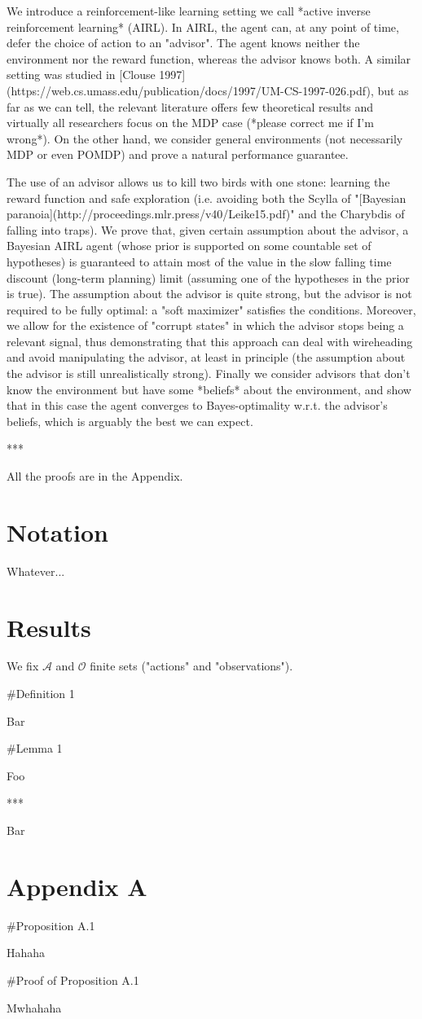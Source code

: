 \documentclass[a4paper]{article}
\newcommand{\Ob}{\mathcal{O}}
\newcommand{\A}{\mathcal{A}}
\begin{document}
We introduce a reinforcement-like learning setting we call *active inverse reinforcement learning* (AIRL). In AIRL, the agent can, at any point of time, defer the choice of action to an "advisor". The agent knows neither the environment nor the reward function, whereas the advisor knows both. A similar setting was studied in [Clouse 1997](https://web.cs.umass.edu/publication/docs/1997/UM-CS-1997-026.pdf), but as far as we can tell, the relevant literature offers few theoretical results and virtually all researchers focus on the MDP case (*please correct me if I'm wrong*). On the other hand, we consider general environments (not necessarily MDP or even POMDP) and prove a natural performance guarantee.

The use of an advisor allows us to kill two birds with one stone: learning the reward function and safe exploration (i.e. avoiding both the Scylla of "[Bayesian paranoia](http://proceedings.mlr.press/v40/Leike15.pdf)" and the Charybdis of falling into traps). We prove that, given certain assumption about the advisor, a Bayesian AIRL agent (whose prior is supported on some countable set of hypotheses) is guaranteed to attain most of the value in the slow falling time discount (long-term planning) limit (assuming one of the hypotheses in the prior is true). The assumption about the advisor is quite strong, but the advisor is not required to be fully optimal: a "soft maximizer" satisfies the conditions. Moreover, we allow for the existence of "corrupt states" in which the advisor stops being a relevant signal, thus demonstrating that this approach can deal with wireheading and avoid manipulating the advisor, at least in principle (the assumption about the advisor is still unrealistically strong). Finally we consider advisors that don't know the environment but have some *beliefs* about the environment, and show that in this case the agent converges to Bayes-optimality w.r.t. the advisor's beliefs, which is arguably the best we can expect.

***

All the proofs are in the Appendix.

\section{Notation}

Whatever...

\section{Results}

We fix $\A$ and $\Ob$ finite sets ("actions" and "observations").

\#Definition 1

Bar

\#Lemma 1

Foo

***

Bar

\section{Appendix A}

\#Proposition A.1

Hahaha

\#Proof of Proposition A.1

Mwhahaha
\end{document}
